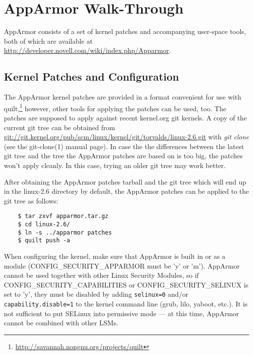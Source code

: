 \documentclass[a4paper]{article}
\renewcommand{\H}{\hspace{0pt}}
\begin{document}
\section{AppArmor Walk-Through}
\label{sec:walk-through}

AppArmor consists of a set of kernel patches and accompanying
user-space tools, both of which are available at
\url{http://developer.novell.com/wiki/index.php/Apparmor}.


\subsection{Kernel Patches and Configuration}

The AppArmor kernel patches are provided in a format convenient for use
with quilt,\footnote{
    \url{http://savannah.nongnu.org/projects/quilt}
} however, other tools for applying the patches can be used, too. The
patches are supposed to apply against recent kernel.org git kernels. A
copy of the current git tree can be obtained from
\url{git://git.kernel.org/pub/scm/linux/kernel/git/torvalds/linux-2.6.git}
with \textit{git clone} (see the \hbox{git-clone(1)} manual page).  In
case the the differences between the latest git tree and the tree the
AppArmor patches are based on is too big, the patches won't apply
cleanly.  In this case, trying an older git tree may work better.

After obtaining the AppArmor patches tarball and the git tree which will
end up in the linux-2.6 directory by default, the AppArmor patches can
be applied to the git tree as follows:

\begin{small}
\begin{verbatim}
    $ tar zxvf apparmor.tar.gz
    $ cd linux-2.6/
    $ ln -s ../apparmor patches
    $ quilt push -a
\end{verbatim}
\end{small}

When configuring the kernel, make sure that AppArmor is built in or as a
module (CONFIG\_{\H}SECURITY\_{\H}APPARMOR must be 'y' or 'm'). AppArmor
cannot be used together with other Linux Security Modules, so if
CONFIG\_{\H}SECURITY\_{\H}CAPABILITIES or CONFIG\_{\H}SECURITY\_{\H}SELINUX is
set to 'y', they must be disabled by adding \texttt{selinux=0} and/or
\texttt{capability.disable=1} to the kernel command line (grub, lilo,
yaboot, etc.).  It is not sufficient to put SELinux into permissive
mode ---  at this time, AppArmor cannot be combined with other LSMs.
\end{document}
